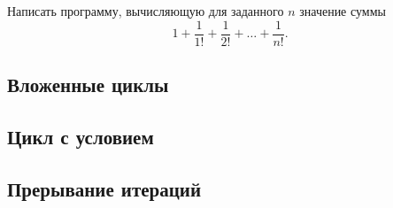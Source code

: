 \task Написать программу, вычисляющую для заданного $n$ значение суммы
\[
1+\frac1{1!} + \frac{1}{2!} + \ldots + \frac1{n!}.
\]

\subsection{Вложенные циклы}

\task

\task

\task

\task

\task

\task

\task

\task

\task

\task

\subsection{Цикл с условием}

\task

\task

\task

\task

\task

\task

\task

\task

\task

\task

\subsection{Прерывание итераций}

\task

\task

\task

\task

\task

\task

\task

\task

\task

\task
